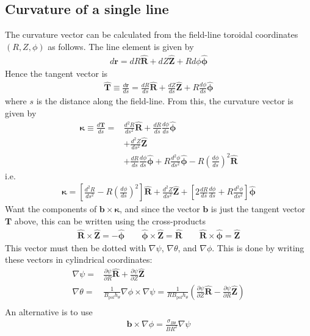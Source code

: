 \documentclass[12pt]{article}
\newcommand{\sbt}{\ensuremath{\sigma_{B\theta}}}
\newcommand{\dd}[2]{\ensuremath{\frac{d #1}{d #2}}}
\newcommand{\ddd}[2]{\ensuremath{\frac{d^2 #1}{d #2^2}}}
\newcommand{\deriv}[2]{\ensuremath{\frac{\partial #1}{\partial #2}}}
\newcommand{\hthe}{\ensuremath{h_\theta}}
\newcommand{\Bp}{\ensuremath{B_{\text{pol}}}}
\newcommand{\ve}[1]{\ensuremath{\boldsymbol{#1}}}
\newcommand{\hv}[1]{\hat{\ve{#1}}}
\newcommand{\bvec}{\ve{b}}
\newcommand{\kvec}{\ve{\kappa}}
\newcommand{\Rvec}{\ensuremath{\hv{R}}}
\newcommand{\Zvec}{\ensuremath{\hv{Z}}}
\newcommand{\phivec}{\ensuremath{\hv{\phi}}}
\begin{document}
\subsection{Curvature of a single line}
%
The curvature vector can be calculated from the field-line toroidal coordinates
$\left(R,Z,\phi\right)$ as follows. The line element is given by
%
\begin{align*}
d\ve{r} = dR\Rvec + dZ\Zvec + Rd\phi\phivec
\end{align*}
%
Hence the tangent vector is
%
\begin{align*}
\hv{T} \equiv \dd{\ve{r}}{s} = \dd{R}{s}\Rvec + \dd{Z}{s}\Zvec +
R\dd{\phi}{s}\phivec
\end{align*}
%
where $s$ is the distance along the field-line. From this, the curvature vector
is given by
%
\begin{align*}
\kvec \equiv \dd{\ve{T}}{s} =& \ddd{R}{s}\Rvec + \dd{R}{s}\dd{\phi}{s}\phivec
    \\ &+ \ddd{Z}{s}\Zvec \\ &+ \dd{R}{s}\dd{\phi}{s}\phivec +
    R\ddd{\phi}{s}\phivec - R\left(\dd{\phi}{s}\right)^2 \Rvec
\end{align*}
%
i.e.
%
\begin{align}
\kvec = \left[\ddd{R}{s} - R\left(\dd{\phi}{s}\right)^2\right]\Rvec +
\ddd{Z}{s}\Zvec + \left[2\dd{R}{s}\dd{\phi}{s} + R\ddd{\phi}{s}\right]\phivec
\label{eq:kappaline}
\end{align}
%
Want the components of $\ve{b}\times\kvec$, and since the vector $\ve{b}$ is
just the tangent vector $\ve{T}$ above, this can be written using the
cross-products
%
\begin{align*}
\Rvec\times\Zvec = -\phivec \qquad \phivec\times\Zvec = \Rvec \qquad
\Rvec\times\phivec = \Zvec
\end{align*}
%
This vector must then be dotted with $\nabla\psi$, $\nabla\theta$, and
$\nabla\phi$. This is done by writing these vectors in cylindrical coordinates:
%
\begin{align*}
\nabla\psi =& \deriv{\psi}{R}\hv{R} + \deriv{\psi}{Z}\hv{Z} \\ \nabla\theta =&
    \frac{1}{\Bp\hthe}\nabla\phi\times\nabla\psi =
    \frac{1}{R\Bp\hthe}\left(\deriv{\psi}{Z}\hv{R} -
    \deriv{\psi}{R}\hv{Z}\right) \\
\end{align*}
%
An alternative is to use
%
\begin{align*}
\bvec \times \nabla\phi = \frac{\sbt}{BR^2}\nabla\psi
\end{align*}
\end{document}
